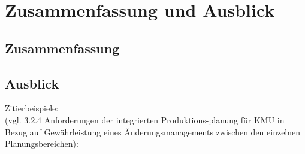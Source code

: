 \chapter{Zusammenfassung und Ausblick}
\section{Zusammenfassung}

\section{Ausblick}
Zitierbeispiele:\\
(vgl. 3.2.4 Anforderungen der integrierten Produktions-planung für KMU in Bezug auf Gewährleistung eines Änderungsmanagements zwischen den einzelnen Planungsbereichen):\\
\citep{Baden:2014}